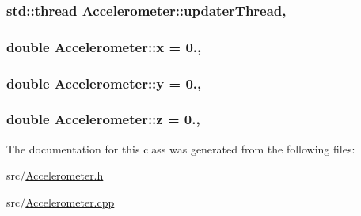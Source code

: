 \subsubsection[{updater\+Thread}]{\setlength{\rightskip}{0pt plus 5cm}std\+::thread Accelerometer\+::updater\+Thread\hspace{0.3cm}{\ttfamily [static]}, {\ttfamily [private]}}\label{classAccelerometer_a8b9d7d942de3ac41f6fe2b2c7e3f15e8}
\hypertarget{classAccelerometer_af06011557497aa4603cbe47966f32aaf}{}
\subsubsection[{x}]{\setlength{\rightskip}{0pt plus 5cm}double Accelerometer\+::x = 0.\hspace{0.3cm}{\ttfamily [static]}, {\ttfamily [private]}}\label{classAccelerometer_af06011557497aa4603cbe47966f32aaf}
\hypertarget{classAccelerometer_a4cba3b73c6339058c046baf1659595fc}{}
\subsubsection[{y}]{\setlength{\rightskip}{0pt plus 5cm}double Accelerometer\+::y = 0.\hspace{0.3cm}{\ttfamily [static]}, {\ttfamily [private]}}\label{classAccelerometer_a4cba3b73c6339058c046baf1659595fc}
\hypertarget{classAccelerometer_ac11a92cc27528e883bbfe04cf4a150f7}{}
\subsubsection[{z}]{\setlength{\rightskip}{0pt plus 5cm}double Accelerometer\+::z = 0.\hspace{0.3cm}{\ttfamily [static]}, {\ttfamily [private]}}\label{classAccelerometer_ac11a92cc27528e883bbfe04cf4a150f7}


The documentation for this class was generated from the following files\+:\begin{DoxyCompactItemize}
\item 
src/\hyperlink{Accelerometer_8h}{Accelerometer.\+h}\item 
src/\hyperlink{Accelerometer_8cpp}{Accelerometer.\+cpp}\end{DoxyCompactItemize}
